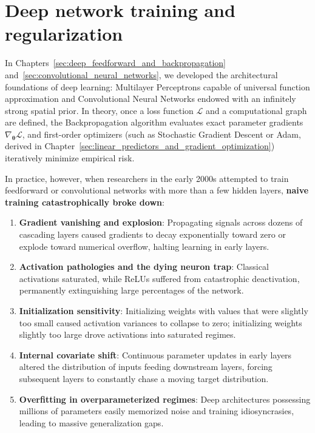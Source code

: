 \chapter{Deep network training and regularization}
\label{sec:deep_network_training_and_regularization}

In Chapters~\ref{sec:deep_feedforward_and_backpropagation} and~\ref{sec:convolutional_neural_networks}, we developed the architectural foundations of deep learning: Multilayer Perceptrons capable of universal function approximation and Convolutional Neural Networks endowed with an infinitely strong spatial prior. In theory, once a loss function $\mathcal{L}$ and a computational graph are defined, the Backpropagation algorithm evaluates exact parameter gradients $\nabla_{\boldsymbol{\theta}} \mathcal{L}$, and first-order optimizers (such as Stochastic Gradient Descent or Adam, derived in Chapter~\ref{sec:linear_predictors_and_gradient_optimization}) iteratively minimize empirical risk.

In practice, however, when researchers in the early 2000s attempted to train feedforward or convolutional networks with more than a few hidden layers, \textbf{naive training catastrophically broke down}:
\begin{enumerate}[noitemsep,topsep=2pt,parsep=0pt,partopsep=0pt]
  \item \textbf{Gradient vanishing and explosion}: Propagating signals across dozens of cascading layers caused gradients to decay exponentially toward zero or explode toward numerical overflow, halting learning in early layers.
  \item \textbf{Activation pathologies and the dying neuron trap}: Classical activations saturated, while ReLUs suffered from catastrophic deactivation, permanently extinguishing large percentages of the network.
  \item \textbf{Initialization sensitivity}: Initializing weights with values that were slightly too small caused activation variances to collapse to zero; initializing weights slightly too large drove activations into saturated regimes.
  \item \textbf{Internal covariate shift}: Continuous parameter updates in early layers altered the distribution of inputs feeding downstream layers, forcing subsequent layers to constantly chase a moving target distribution.
  \item \textbf{Overfitting in overparameterized regimes}: Deep architectures possessing millions of parameters easily memorized noise and training idiosyncrasies, leading to massive generalization gaps.
\end{enumerate}

